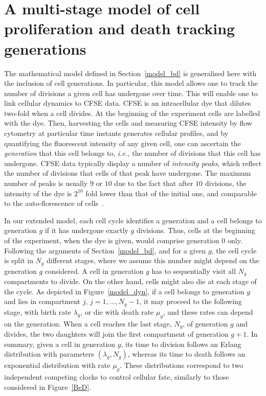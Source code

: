 \documentclass[10pt]{article}
\numberwithin{equation}{section}
\begin{document}
\section{A multi-stage model of cell proliferation and death tracking generations}
\label{model_gener}

The mathematical model defined in Section~\ref{model_bd} is generalised here with the inclusion of cell generations. In particular, this model allows one to track the number of divisions a
given cell has undergone over time. This 
will enable one to link  cellular dynamics to CFSE data. CFSE is an intracellular dye that dilutes two-fold when a cell divides. At the beginning of the experiment  cells are labelled with the dye. Then, harvesting the cells and measuring CFSE intensity by flow cytometry at particular time instants generates cellular profiles, and by quantifying the fluorescent intensity of any given cell, one can ascertain the {\it generation} that this cell belongs to, {\em i.e.,} the number of divisions that this cell has undergone. CFSE data typically display a number of {\it intensity peaks}, which reflect the number of divisions that cells of that peak have undergone. The maximum number of peaks is usually  $9$ or $10$ due to the fact that after $10$ divisions, the intensity of the dye is $2^{10}$ fold lower than  that of the initial one, and comparable to the auto-florescence of  cells~\cite{ganusov}.

\par In our extended model, each cell cycle identifies a generation and a cell belongs to generation $g$ if it has undergone exactly $g$ divisions. Thus, cells at the beginning of the experiment, when the dye is given, would comprise generation $0$ only. Following the arguments of Section~\ref{model_bd}, and for 
a given $g$, the cell cycle is split in  $N_g$ different stages, 
where we assume this number might depend on the generation $g$ considered. A cell in generation $g$ has to sequentially visit all $N_g$ compartments to divide. On the other hand, cells might also die at each stage of the cycle. As depicted in Figure~\ref{model_dyn}, if a cell belongs to generation $g$ and lies in compartment $j$, $j=1,\ldots,N_g-1$, it may proceed to the following stage, with birth rate $\lambda_g$, or die with death rate $\mu_g$, and these rates can depend on the generation. When a cell reaches the last stage, $N_g$, of generation $g$ and divides, the two daughters will join the first compartment of generation $g+1$. In summary, given a cell in generation $g$, its time to division follows an Erlang distribution with parameters $(\lambda_g,N_g)$, whereas its time to death follows an exponential distribution with rate $\mu_g$.
These  distributions correspond to two independent competing clocks 
to control cellular fate, similarly to those considered
in Figure~\ref{BeD}.
\end{document}
